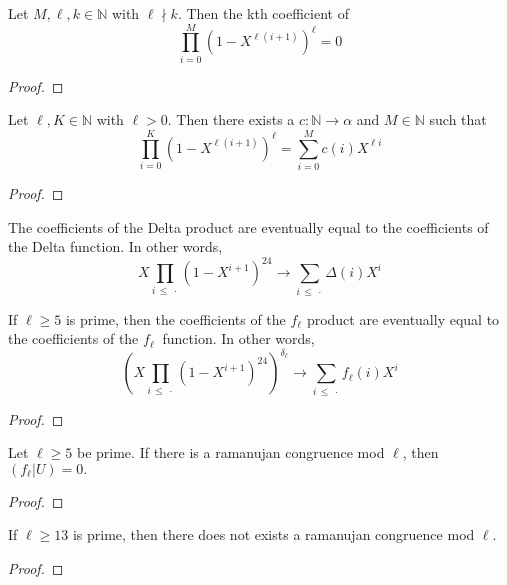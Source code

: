\begin{lemma}
  \label{lem:coeff_zero_of_ndvd}
  \leanok
  Let $M, \ell, k \in \mathbb{N}$ with $\ell \nmid k$. Then the kth coefficient of 
  \[ \prod_{i = 0}^{M} (1 - X ^ {\ell (i + 1)}) ^ \ell = 0 \]
\end{lemma}
\begin{proof}
  \leanok
\end{proof}

\begin{lemma}
  \label{lem:prod_eq_sum}
  \leanok
  Let $\ell, K \in \mathbb{N}$ with $\ell > 0$. Then there exists a  $c : \mathbb{N} \to \alpha$ 
  and $M \in \mathbb{N}$ such that 
  \[ \prod _{i = 0}^{K} (1 - X ^ {\ell (i + 1)}) ^ \ell = 
      \sum_{i = 0}^{M} c (i) X ^ {\ell i} \]
\end{lemma}
\begin{proof}
  \leanok
\end{proof}

\begin{theorem}
  \label{thm:DeltaProduct_eventually_sum}
  \leanok
  The coefficients of the Delta product are eventually equal to the coefficients of the Delta function.
  In other words, 
  \[ X \prod_{i \, \le \: \cdot} (1 - X ^ {i + 1}) ^ {24} \longrightarrow 
    \sum_{i \, \le \: \cdot} \Delta (i) X ^ i \]
\end{theorem}

\begin{theorem}
  \label{thm:fl_Product_eventually_sum}
  \leanok
  If $\ell \ge 5$ is prime, then
  the coefficients of the $f_\ell$ product are eventually equal to the coefficients of the $f_\ell \:$ function.
  In other words,
  \[ (X \prod_{i \, \le \: \cdot} (1 - X ^ {i + 1}) ^ {24}) ^ {\delta_\ell} \longrightarrow 
    \sum_{i \, \le \: \cdot} f_\ell (i) X ^ i \]
\end{theorem}
\begin{proof}
  \leanok
\end{proof}


\begin{theorem} 
  \label{thm:flu_eq_zero}
  \leanok
  Let $\ell \ge 5$ be prime. If there is a ramanujan congruence mod $\ell$,
  then $(f_\ell | U) = 0.$
\end{theorem}
\begin{proof}
  \leanok
\end{proof}

\begin{theorem}
  \label{thm:MainResult}
  \leanok
  If $\ell \ge 13$ is prime, then there does not exists a ramanujan congruence mod $\ell$.
\end{theorem}
\begin{proof}
  \leanok
\end{proof}


